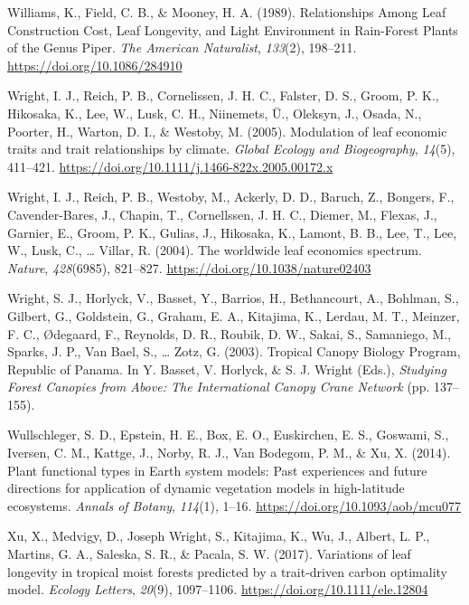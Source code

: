 \documentclass[
  12pt,
  a4paper,
,tablecaptionabove
]{scrartcl}
\newlength{\cslhangindent}
\newenvironment{CSLReferences}[2] %
 {%
  \setlength{\parindent}{0pt}
  \ifodd #1 \everypar{\setlength{\hangindent}{\cslhangindent}}\ignorespaces\fi
  \ifnum #2 > 0
  \setlength{\parskip}{#2\baselineskip}
  \fi
 }%
 {}
\begin{document}
\begin{CSLReferences}{1}{0}
\leavevmode{}%
Williams, K., Field, C. B., \& Mooney, H. A. (1989). Relationships
{Among Leaf Construction Cost}, {Leaf Longevity}, and {Light
Environment} in {Rain-Forest Plants} of the {Genus Piper}. \emph{The
American Naturalist}, \emph{133}(2), 198--211.
\url{https://doi.org/10.1086/284910}

\leavevmode{}%
Wright, I. J., Reich, P. B., Cornelissen, J. H. C., Falster, D. S.,
Groom, P. K., Hikosaka, K., Lee, W., Lusk, C. H., Niinemets, Ü.,
Oleksyn, J., Osada, N., Poorter, H., Warton, D. I., \& Westoby, M.
(2005). Modulation of leaf economic traits and trait relationships by
climate. \emph{Global Ecology and Biogeography}, \emph{14}(5), 411--421.
\url{https://doi.org/10.1111/j.1466-822x.2005.00172.x}

\leavevmode{}%
Wright, I. J., Reich, P. B., Westoby, M., Ackerly, D. D., Baruch, Z.,
Bongers, F., Cavender-Bares, J., Chapin, T., Cornellssen, J. H. C.,
Diemer, M., Flexas, J., Garnier, E., Groom, P. K., Gulias, J., Hikosaka,
K., Lamont, B. B., Lee, T., Lee, W., Lusk, C., \ldots{} Villar, R.
(2004). The worldwide leaf economics spectrum. \emph{Nature},
\emph{428}(6985), 821--827. \url{https://doi.org/10.1038/nature02403}

\leavevmode{}%
Wright, S. J., Horlyck, V., Basset, Y., Barrios, H., Bethancourt, A.,
Bohlman, S., Gilbert, G., Goldstein, G., Graham, E. A., Kitajima, K.,
Lerdau, M. T., Meinzer, F. C., Ødegaard, F., Reynolds, D. R., Roubik, D.
W., Sakai, S., Samaniego, M., Sparks, J. P., Van Bael, S., \ldots{}
Zotz, G. (2003). Tropical {Canopy Biology Program}, {Republic} of
{Panama}. In Y. Basset, V. Horlyck, \& S. J. Wright (Eds.),
\emph{Studying {Forest Canopies} from {Above}: {The International Canopy
Crane Network}} (pp. 137--155).

\leavevmode{}%
Wullschleger, S. D., Epstein, H. E., Box, E. O., Euskirchen, E. S.,
Goswami, S., Iversen, C. M., Kattge, J., Norby, R. J., Van Bodegom, P.
M., \& Xu, X. (2014). Plant functional types in {Earth} system models:
{Past} experiences and future directions for application of dynamic
vegetation models in high-latitude ecosystems. \emph{Annals of Botany},
\emph{114}(1), 1--16. \url{https://doi.org/10.1093/aob/mcu077}

\leavevmode{}%
Xu, X., Medvigy, D., Joseph Wright, S., Kitajima, K., Wu, J., Albert, L.
P., Martins, G. A., Saleska, S. R., \& Pacala, S. W. (2017). Variations
of leaf longevity in tropical moist forests predicted by a trait-driven
carbon optimality model. \emph{Ecology Letters}, \emph{20}(9),
1097--1106. \url{https://doi.org/10.1111/ele.12804}

\end{CSLReferences}
\end{document}
